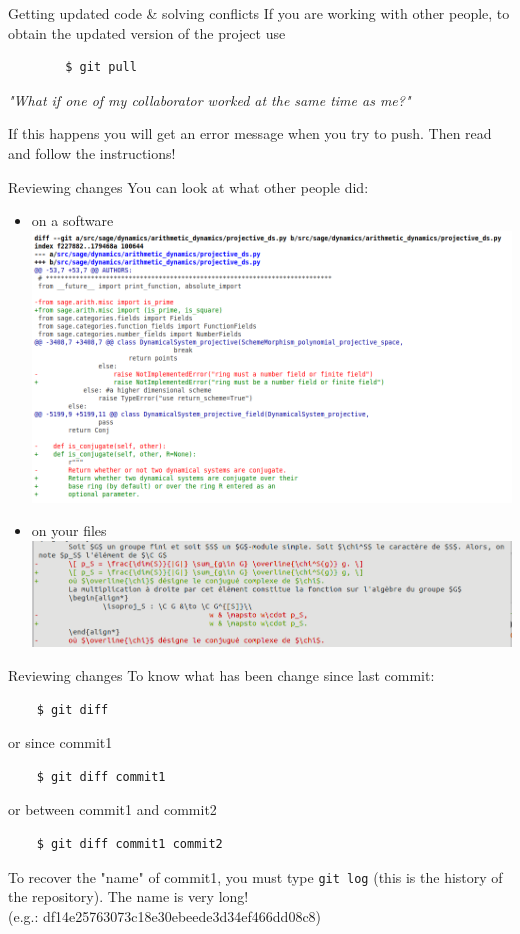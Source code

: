 \documentclass{beamer}
\begin{document}
	\begin{frame}[fragile]{Getting updated code \& solving conflicts}
		If you are working with other people, to obtain the updated version of the project use 
		\begin{verbatim}
		$ git pull
		\end{verbatim}
		
		\textit{"What if one of my collaborator worked at the same time as me?"}
		
		If this happens you will get an error message when you try to push. Then read and follow the instructions!  
	\end{frame}

	\begin{frame}{Reviewing changes}
	You can look at what other people did:
	\begin{itemize}
		\item on a software\\
		\includegraphics[width=0.8\linewidth]{diff_on_sage_2}  %
		\item on your files\\
		\includegraphics[width=0.8\linewidth]{diff_on_latex}
	\end{itemize}
	\end{frame}

	\begin{frame}[fragile]{Reviewing changes}
	To know what has been change since last commit:
	\begin{verbatim}
	$ git diff
	\end{verbatim}
	or since commit1 
	\begin{verbatim}
	$ git diff commit1
	\end{verbatim}
	or between commit1 and commit2
	\begin{verbatim}
	$ git diff commit1 commit2
	\end{verbatim}
	\begin{tcolorbox}[colback=cyan!30]
	To recover the "name" of commit1, you must type \texttt{git log} (this is the history of the repository). The name is very long!\\
	(e.g.: df14e25763073c18e30ebeede3d34ef466dd08c8)
	\end{tcolorbox}
	\end{frame}
\end{document}

